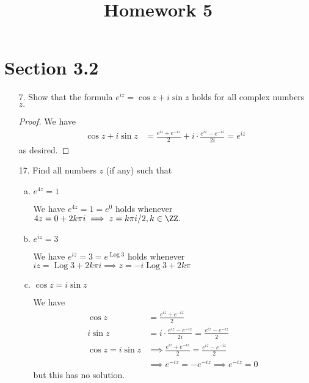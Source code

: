 \documentclass{article}
\DeclareMathOperator{\Log}{Log}
\begin{document}
\title{Homework 5}
\maketitle
\thispagestyle{fancy}

\section*{Section 3.2}

\begin{itemize}
	\item[7.] Show that the formula $e^{iz} = \cos z + i\sin z$ holds for all complex numbers $z.$
		\begin{proof}
			We have
			\begin{align*}
				\cos z + i\sin z &= \frac{e^{iz} + e^{-iz}}{2} + i\cdot \frac{e^{iz} -e^{-iz}}{2i} = e^{iz}
			\end{align*}
			as desired.
		\end{proof}

	\item[17.] Find all numbers $z$ (if any) such that
		\begin{enumerate}[(a)]
			\item $e^{4z} = 1$
				\begin{soln}
					We have $e^{4z} = 1 = e^{0}$ holds whenever $4z = 0 + 2k\pi i \implies z = k\pi i/2, k\in\ZZ.$
				\end{soln}

			\item $e^{iz} = 3$
				\begin{soln}
					We have $e^{iz} = 3 = e^{\Log 3}$ holds whenever $iz = \Log 3 + 2k\pi i\implies z = -i \Log 3 + 2k\pi$
				\end{soln}

			\item $\cos z = i\sin z$
				\begin{soln}
					We have
					\begin{align*}
						\cos z &= \frac{e^{iz} + e^{-iz}}{2} \\
						i\sin z &= i\cdot \frac{e^{iz} - e^{-iz}}{2i} = \frac{e^{iz} - e^{-iz}}{2} \\
						\cos z = i\sin z &\implies \frac{e^{iz}+e^{-iz}}{2} = \frac{e^{iz} - e^{-iz}}{2} \\
						&\implies e^{-iz} = -e^{-iz} \implies e^{-iz} = 0
					\end{align*}
					but this has no solution.
				\end{soln}
				

\end{enumerate}
\end{itemize}
\end{document}
